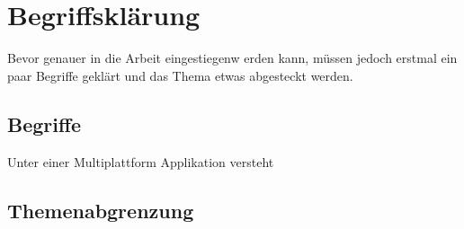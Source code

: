 \chapter{Begriffsklärung}

Bevor genauer in die Arbeit eingestiegenw erden kann, müssen jedoch erstmal ein paar Begriffe geklärt und das Thema etwas abgesteckt werden.

\section{Begriffe}
Unter einer Multiplattform Applikation versteht 

\section{Themenabgrenzung}